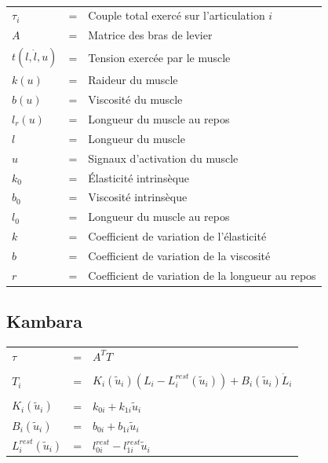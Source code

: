 \documentclass[pdftex,a4paper,11pt]{article}
\numberwithin{equation}{subsection}
\begin{document}
\paragraph{}
\begin{tabular}{lcl}
    $\tau_i$ & = & Couple total exercé sur l'articulation $i$ \\
    $A$  & = & Matrice des bras de levier \\
    $t(l, \dot{l}, u)$  & = & Tension exercée par le muscle \\
    $k(u)$ & = & Raideur du muscle \\
    $b(u)$ & = & Viscosité du muscle \\
    $l_r(u)$ & = & Longueur du muscle au repos \\
    $l$ & = & Longueur du muscle \\
    $u$ & = & Signaux d'activation du muscle \\
    $k_0$ & = & Élasticité intrinsèque \\
    $b_0$ & = & Viscosité intrinsèque \\
    $l_0$ & = & Longueur du muscle au repos \\
    $k$ & = & Coefficient de variation de l'élasticité \\
    $b$ & = & Coefficient de variation de la viscosité \\
    $r$ & = & Coefficient de variation de la longueur au repos \\
\end{tabular}


\subsection{Kambara}

\begin{tabular}{lcl}
    $\tau$ & = & $A^T T$ \\
    \\
    $T_i$                     & = & $K_i(\tilde{u}_i) (L_i - L_i^{rest}(\tilde{u}_i)) + B_i(\tilde{u}_i) \dot{L}_i$ \\
    \\
    $K_i(\tilde{u}_i)$        & = & $k_{0i} + k_{1i} \tilde{u}_i$ \\
    $B_i(\tilde{u}_i)$        & = & $b_{0i} + b_{1i} \tilde{u}_i$ \\
    $L_i^{rest}(\tilde{u}_i)$ & = & $ l_{0i}^{rest} - l_{1i}^{rest} \tilde{u}_i$ \\
\end{tabular}
\end{document}

